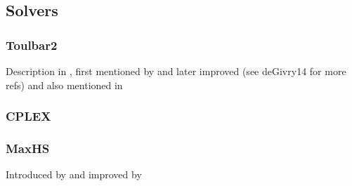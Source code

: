 \subsection{Solvers}

\subsubsection{Toulbar2}
Description in \parencite{Allouche10}, first mentioned by \textcite{deGivry05} and later improved (see deGivry14 for more refs) and also mentioned in \parencite{Sanchez08}

\subsubsection{CPLEX}

\subsubsection{MaxHS}
Introduced by \textcite{Davies11} and improved by \parencite{Davies13}

